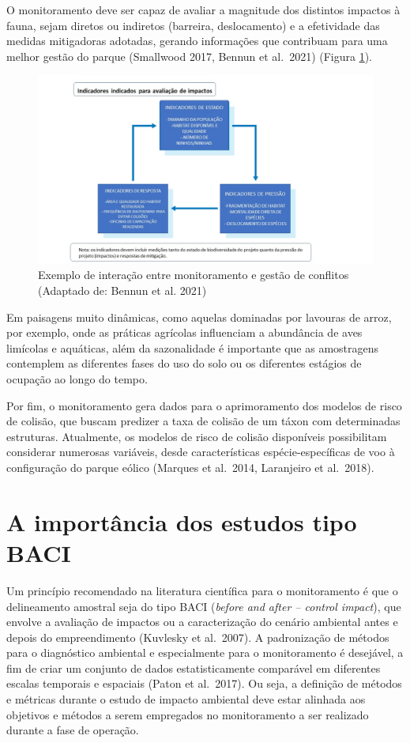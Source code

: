 \documentclass[
  oneside]{scrbook}
\begin{document}
O monitoramento deve ser capaz de avaliar a magnitude dos distintos impactos à fauna, sejam diretos ou indiretos (barreira, deslocamento) e a efetividade das medidas mitigadoras adotadas, gerando informações que contribuam para uma melhor gestão do parque (Smallwood 2017, Bennun et al.~2021) (Figura \ref{fig:19}).

\begin{figure}[H]

{\centering \includegraphics[width=0.75\linewidth]{imagens/cap06/Figura_6.2} 

}

\caption{Exemplo de interação entre monitoramento e gestão de conflitos (Adaptado de: Bennun et al. 2021)}\label{fig:19}
\end{figure}

Em paisagens muito dinâmicas, como aquelas dominadas por lavouras de arroz, por exemplo, onde as práticas agrícolas influenciam a abundância de aves limícolas e aquáticas, além da sazonalidade é importante que as amostragens contemplem as diferentes fases do uso do solo ou os diferentes estágios de ocupação ao longo do tempo.

Por fim, o monitoramento gera dados para o aprimoramento dos modelos de risco de colisão, que buscam predizer a taxa de colisão de um táxon com determinadas estruturas. Atualmente, os modelos de risco de colisão disponíveis possibilitam considerar numerosas variáveis, desde características espécie-específicas de voo à configuração do parque eólico (Marques et al.~2014, Laranjeiro et al.~2018).

\hypertarget{a-importuxe2ncia-dos-estudos-tipo-baci}{%
\section{A importância dos estudos tipo BACI}\label{a-importuxe2ncia-dos-estudos-tipo-baci}}

Um princípio recomendado na literatura científica para o monitoramento é que o delineamento amostral seja do tipo BACI (\emph{before and after -- control impact}), que envolve a avaliação de impactos ou a caracterização do cenário ambiental antes e depois do empreendimento (Kuvlesky et al.~2007). A padronização de métodos para o diagnóstico ambiental e especialmente para o monitoramento é desejável, a fim de criar um conjunto de dados estatisticamente comparável em diferentes escalas temporais e espaciais (Paton et al.~2017). Ou seja, a definição de métodos e métricas durante o estudo de impacto ambiental deve estar alinhada aos objetivos e métodos a serem empregados no monitoramento a ser realizado durante a fase de operação.
\end{document}
